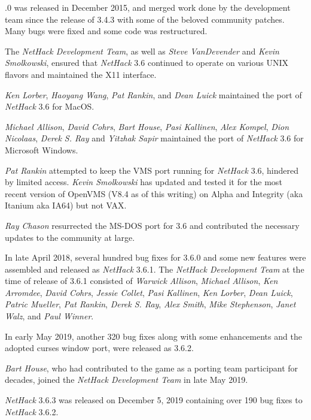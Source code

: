 \documentclass[titlepage]{article}
\begin{document}
.0 was released in December 2015, and merged work done by the development
team since the release of 3.4.3 with some of the beloved community
patches.  Many bugs were fixed and some code was restructured.

\medskip
The \textit{NetHack Development Team}, as well as \textit{Steve VanDevender} and
\textit{Kevin Smolkowski}, ensured that \textit{NetHack} 3.6 continued to
operate on various UNIX flavors and maintained the X11 interface.

\medskip
\textit{Ken Lorber}, \textit{Haoyang Wang}, \textit{Pat Rankin}, and \textit{Dean Luick}
maintained the port of \textit{NetHack} 3.6 for MacOS.

\medskip
\textit{Michael Allison}, \textit{David Cohrs}, \textit{Bart House},
\textit{Pasi Kallinen}, \textit{Alex Kompel}, \textit{Dion Nicolaas},
\textit{Derek S. Ray} and  \textit{Yitzhak Sapir}
maintained the port of  \textit{NetHack} 3.6 for Microsoft Windows.

\medskip
\textit{Pat Rankin} attempted to keep the VMS port running for \textit{NetHack} 3.6,
hindered by limited access.  \textit{Kevin Smolkowski} has updated and tested it
for the most recent version of OpenVMS (V8.4 as of this writing) on Alpha
and Integrity (aka Itanium aka IA64) but not VAX.

\medskip
\textit{Ray Chason}  resurrected the MS-DOS port for 3.6 and contributed the
necessary updates to the community at large.

\medskip
In late April 2018, several hundred bug fixes for 3.6.0 and some new features
were assembled and released as \textit{NetHack} 3.6.1.
The \textit{NetHack Development Team} at the
time of release of 3.6.1 consisted of
\textit{Warwick Allison}, \textit{Michael Allison}, \textit{Ken Arromdee},
\textit{David Cohrs}, \textit{Jessie Collet},
\textit{Pasi Kallinen}, \textit{Ken Lorber}, \textit{Dean Luick},
\textit{Patric Mueller}, \textit{Pat Rankin}, \textit{Derek S. Ray},
\textit{Alex Smith}, \textit{Mike Stephenson}, \textit{Janet Walz}, and
\textit{Paul Winner}.

\medskip
In early May 2019, another 320 bug fixes along with some enhancements and
the adopted curses window port, were released as 3.6.2.

\medskip
\textit{Bart House}, who had contributed to the game as a porting team participant
for decades, joined the \textit{NetHack Development Team} in late May 2019.

\medskip
\textit{NetHack} 3.6.3 was released on December 5, 2019 containing over 190 bug
fixes to \textit{NetHack} 3.6.2.
\end{document}

